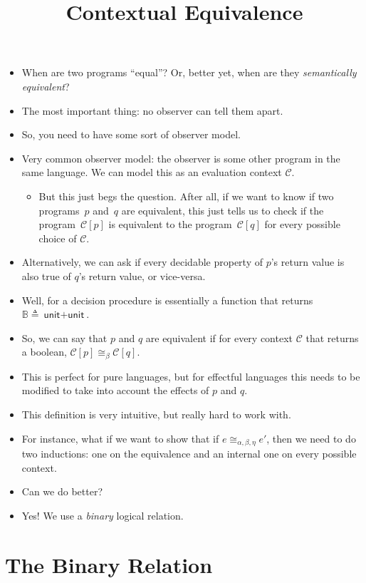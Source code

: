 \documentclass{lecturenotes}
\title{Contextual Equivalence}
\newcommand{\utype}{\textsf{unit}\xspace}
\newcommand{\sumtype}[2]{\ensuremath{#1 + #2}}
\begin{document}
\maketitle

\begin{itemize}
\item When are two programs ``equal''?
  Or, better yet, when are they \emph{semantically equivalent}?
\item The most important thing: no observer can tell them apart.
\item So, you need to have some sort of observer model.
\item Very common observer model: the observer is some other program in the same language.
  We can model this as an evaluation context $\mathcal{C}$.
  \begin{itemize}
  \item But this just begs the question.
    After all, if we want to know if two programs~$p$ and~$q$ are equivalent, this just tells us to check if the program~$\mathcal{C}[p]$ is equivalent to the program~$\mathcal{C}[q]$ for every possible choice of $\mathcal{C}$.
  \end{itemize}
\item Alternatively, we can ask if every decidable property of $p$'s return value is also true of $q$'s return value, or vice-versa.
\item Well, for a decision procedure is essentially a function that returns $\mathbb{B} \triangleq \sumtype{\utype}{\utype}$.
\item So, we can say that $p$ and $q$ are equivalent if for every context $\mathcal{C}$ that returns a boolean, $\mathcal{C}[p] \cong_\beta \mathcal{C}[q]$.
\item This is perfect for pure languages, but for effectful languages this needs to be modified to take into account the effects of $p$ and $q$.
\item This definition is very intuitive, but really hard to work with.
\item For instance, what if we want to show that if $e \cong_{\alpha,\beta,\eta} e'$, then we need to do two inductions: one on the equivalence and an internal one on every possible context.
\item Can we do better?
\item Yes! We use a \emph{binary} logical relation.
\end{itemize}

\section{The Binary Relation}
\label{sec:binary-relation}
\end{document}
